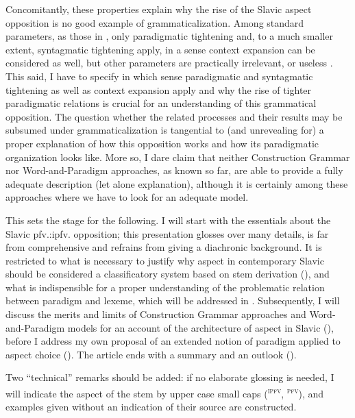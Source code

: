 \documentclass[output=paper]{langscibook}
\begin{document}
Concomitantly, these properties explain why the rise of the Slavic aspect opposition is no good example of grammaticalization. Among standard parameters, as those in \citet{Lehmann1995, HeineKuteva2002, Himmelmann2004}, only paradigmatic tightening and, to a much smaller extent, syntagmatic tightening apply, in a sense context expansion can be considered as well, but other parameters are practically irrelevant, or useless \parencites[ch. 6]{Wiemer2002}{Wiemer2008}[267--270]{Wiemer2020a}{WiemerSerzant2017}. This said, I have to specify in which sense paradigmatic and syntagmatic tightening as well as context expansion apply and why the rise of tighter paradigmatic relations is crucial for an understanding of this grammatical opposition. The question whether the related processes and their results may be subsumed under grammaticalization is tangential to (and unrevealing for) a proper explanation of how this opposition works and how its paradigmatic organization looks like. More so, I dare claim that neither Construction Grammar nor Word-and-Paradigm approaches, as known so far, are able to provide a fully adequate description (let alone explanation), although it is certainly among these approaches where we have to look for an adequate model.

This sets the stage for the following. I will start with the essentials about the Slavic pfv.:ipfv. opposition; this presentation glosses over many details, is far from comprehensive and refrains from giving a diachronic background. It is restricted to what is necessary to justify why aspect in contemporary Slavic should be considered a classificatory system based on stem derivation (), and what is indispensible for a proper understanding of the problematic relation between paradigm and lexeme, which will be addressed in . Subsequently, I will discuss the merits and limits of Construction Grammar approaches and Word-and-Paradigm models for an account of the architecture of aspect in Slavic (), before I address my own proposal of an extended notion of paradigm applied to aspect choice (). The article ends with a summary and an outlook ().

Two “technical” remarks should be added: if no elaborate glossing is needed, I will indicate the aspect of the stem by upper case small caps (\textsc{\textsuperscript{ipfv}}, \textsc{\textsuperscript{pfv}}), and examples given without an indication of their source are constructed.
\end{document}
